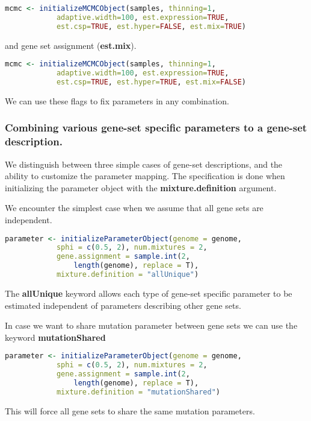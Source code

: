 \begin{lstlisting}[language=R]
mcmc <- initializeMCMCObject(samples, thinning=1, 
			adaptive.width=100, est.expression=TRUE, 
			est.csp=TRUE, est.hyper=FALSE, est.mix=TRUE)
\end{lstlisting}

and gene set assignment (\textbf{est.mix}).

\begin{lstlisting}[language=R]
mcmc <- initializeMCMCObject(samples, thinning=1, 
			adaptive.width=100, est.expression=TRUE, 
			est.csp=TRUE, est.hyper=TRUE, est.mix=FALSE)
\end{lstlisting}

We can use these flags to fix parameters in any combination.

\subsubsection{Combining various gene-set specific parameters to a gene-set description.}

We distinguish between three simple cases of gene-set descriptions, and the ability to customize the parameter
mapping. The specification is done when initializing the parameter object with the \textbf{mixture.definition}
argument.

We encounter the simplest case when we assume that all gene sets are independent.

\begin{lstlisting}[language=R]
parameter <- initializeParameterObject(genome = genome, 
			sphi = c(0.5, 2), num.mixtures = 2,
			gene.assignment = sample.int(2, 
				length(genome), replace = T),
			mixture.definition = "allUnique")
\end{lstlisting}

The \textbf{allUnique} keyword allows each type of gene-set specific parameter to be estimated independent of parameters describing other gene sets.

In case we want to share mutation parameter between gene sets we can use the keyword \textbf{mutationShared}

\begin{lstlisting}[language=R]
parameter <- initializeParameterObject(genome = genome, 
			sphi = c(0.5, 2), num.mixtures = 2,
			gene.assignment = sample.int(2, 
				length(genome), replace = T),
			mixture.definition = "mutationShared")
\end{lstlisting}

This will force all gene sets to share the same mutation parameters.

